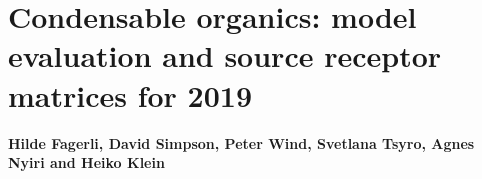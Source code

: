 \chapter[Condensable organics]{Condensable organics: model evaluation and source receptor matrices for 2019}
\label{ch:Condensables}

{\bf{Hilde Fagerli, David Simpson, Peter Wind, Svetlana Tsyro, Agnes Nyiri and Heiko Klein}}\\
\vspace{30pt}
	    

\clearpage


\renewcommand\bibname{References}      %

